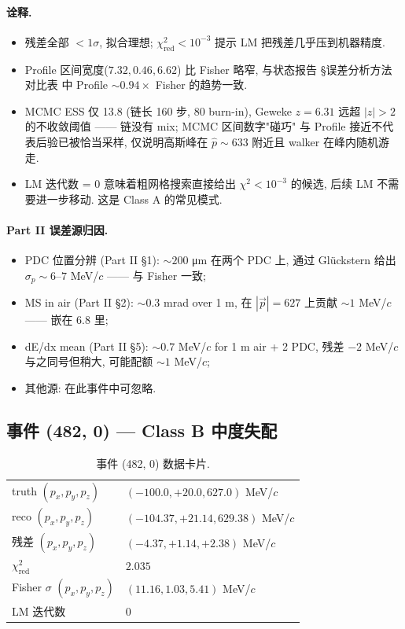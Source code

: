 \paragraph{诠释.}
\begin{itemize}[nosep]
  \item 残差全部 $< 1\sigma$, 拟合理想; $\chi^2_{\mathrm{red}} < 10^{-3}$ 提示 LM 把残差几乎压到机器精度.
  \item Profile 区间宽度($7.32, 0.46, 6.62$) 比 Fisher 略窄, 与状态报告 §误差分析方法对比表 中 Profile $\sim 0.94 \times$ Fisher 的趋势一致.
  \item MCMC ESS 仅 13.8 (链长 160 步, 80 burn-in), Geweke $z = 6.31$ 远超 $|z| > 2$ 的不收敛阈值 —— 链没有 mix; MCMC 区间数字"碰巧" 与 Profile 接近不代表后验已被恰当采样, 仅说明高斯峰在 $\hat p \sim 633$ 附近且 walker 在峰内随机游走.
  \item LM 迭代数 = 0 意味着粗网格搜索直接给出 $\chi^2 < 10^{-3}$ 的候选, 后续 LM 不需要进一步移动. 这是 Class A 的常见模式.
\end{itemize}

\paragraph{Part II 误差源归因.}
\begin{itemize}[nosep]
  \item PDC 位置分辨 (Part II §1): $\sim 200$ μm 在两个 PDC 上, 通过 Glückstern 给出 $\sigma_p \sim 6$--$7$ MeV/$c$ —— 与 Fisher 一致;
  \item MS in air (Part II §2): $\sim 0.3$ mrad over 1 m, 在 $|\vec p| = 627$ 上贡献 $\sim 1$ MeV/$c$ —— 嵌在 6.8 里;
  \item dE/dx mean (Part II §5): $\sim 0.7$ MeV/$c$ for 1 m air + 2 PDC, 残差 $-2$ MeV/$c$ 与之同号但稍大, 可能配额 $\sim 1$ MeV/$c$;
  \item 其他源: 在此事件中可忽略.
\end{itemize}

\subsection{事件 (482, 0) — Class B 中度失配}
\label{sec:partIII:case_studies:event_482}

\begin{table}[H]
\centering\small
\caption{事件 (482, 0) 数据卡片.}
\begin{tabular}{ll}
\toprule
truth $(p_x, p_y, p_z)$ & $(-100.0, +20.0, 627.0)$ MeV/$c$ \\
reco $(p_x, p_y, p_z)$ & $(-104.37, +21.14, 629.38)$ MeV/$c$ \\
残差 $(p_x, p_y, p_z)$ & $(-4.37, +1.14, +2.38)$ MeV/$c$ \\
$\chi^2_{\mathrm{red}}$ & $2.035$ \\
Fisher $\sigma$ $(p_x, p_y, p_z)$ & $(11.16, 1.03, 5.41)$ MeV/$c$ \\
LM 迭代数 & 0 \\
\bottomrule
\end{tabular}
\end{table}

